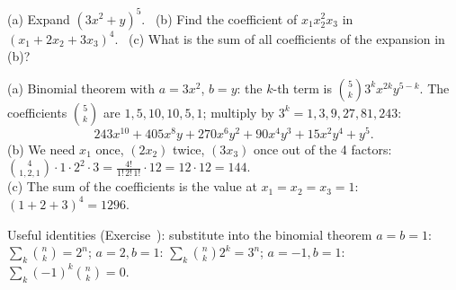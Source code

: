 
\begin{problem}
	(a) Expand $(3x^2+y)^5$. \
	(b) Find the coefficient of $x_1x_2^2x_3$ in $(x_1+2x_2+3x_3)^4$. \
	(c) What is the sum of all coefficients of the expansion in (b)?
\end{problem}

\begin{slides}
	\small
	\exstatement
	\pause
	\sol
	(a) Binomial theorem with $a=3x^2$, $b=y$: the $k$-th term is
	$\binom5k3^kx^{2k}y^{5-k}$. The coefficients $\binom5k$ are
	$1,5,10,10,5,1$; multiply by $3^k=1,3,9,27,81,243$:
	\[ 243x^{10}+405x^8y+270x^6y^2+90x^4y^3+15x^2y^4+y^5. \]
	(b) We need $x_1$ once, $(2x_2)$ twice, $(3x_3)$ once out of the 4 factors:
	$\binom{4}{1,2,1}\cdot 1\cdot 2^2\cdot 3 = \frac{4!}{1!\,2!\,1!}\cdot 12
		= 12\cdot 12 = 144$.\\[1mm]
	(c) The sum of the coefficients is the value at $x_1=x_2=x_3=1$:
	$(1+2+3)^4 = 1296$.
	\pause
	\begin{alertblock}{Useful identities (Exercise~): substitute into the binomial theorem}
		$a=b=1$: $\sum_k\binom nk = 2^n$; \quad $a=2,b=1$:
		$\sum_k\binom nk 2^k = 3^n$; \quad $a=-1,b=1$:
		$\sum_k(-1)^k\binom nk = 0$.
	\end{alertblock}
\end{slides}

